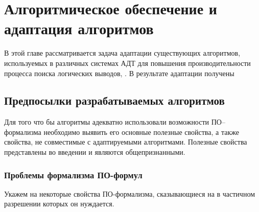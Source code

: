 \chapter{Алгоритмическое обеспечение и адаптация алгоритмов}

В этой главе рассматривается задача адаптации существующих алгоритмов,
используемых в различных системах АДТ для повышения производительности
процесса поиска логических выводов, . В результате адаптации получены 

\section{Предпосылки разрабатываемых алгоритмов}

Для того что бы алгоритмы адекватно использовали возможности
ПО--формализма необходимо выявить его основные полезные свойства, а также свойства, не совместимые с адаптируемыми алгоритмами.  Полезные свойства представлены во введении и являются общепризнанными.

\subsection{Проблемы формализма ПО-формул}
Укажем на некоторые свойства ПО-формализма, сказывающиеся на
 в частичном разрешении которых он нуждается.

